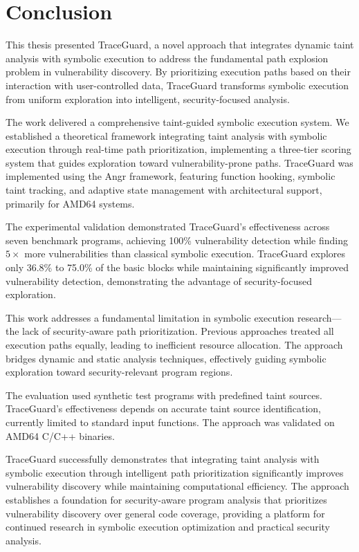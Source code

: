 \chapter{Conclusion}

This thesis presented TraceGuard, a novel approach that integrates dynamic taint analysis with symbolic execution to address the fundamental path explosion problem in vulnerability discovery. By prioritizing execution paths based on their interaction with user-controlled data, TraceGuard transforms symbolic execution from uniform exploration into intelligent, security-focused analysis.

The work delivered a comprehensive taint-guided symbolic execution system. We established a theoretical framework integrating taint analysis with symbolic execution through real-time path prioritization, implementing a three-tier scoring system that guides exploration toward vulnerability-prone paths. TraceGuard was implemented using the Angr framework, featuring function hooking, symbolic taint tracking, and adaptive state management with architectural support, primarily for AMD64 systems.

The experimental validation demonstrated TraceGuard's effectiveness across seven benchmark programs, achieving 100\% vulnerability detection while finding $5 \times$ more vulnerabilities than classical symbolic execution. TraceGuard explores only 36.8\% to 75.0\% of the basic blocks while maintaining significantly improved vulnerability detection, demonstrating the advantage of security-focused exploration.

This work addresses a fundamental limitation in symbolic execution research—the lack of security-aware path prioritization. Previous approaches treated all execution paths equally, leading to inefficient resource allocation. The approach bridges dynamic and static analysis techniques, effectively guiding symbolic exploration toward security-relevant program regions.

The evaluation used synthetic test programs with predefined taint sources. TraceGuard's effectiveness depends on accurate taint source identification, currently limited to standard input functions. The approach was validated on AMD64 C/C++ binaries.

TraceGuard successfully demonstrates that integrating taint analysis with symbolic execution through intelligent path prioritization significantly improves vulnerability discovery while maintaining computational efficiency. The approach establishes a foundation for security-aware program analysis that prioritizes vulnerability discovery over general code coverage, providing a platform for continued research in symbolic execution optimization and practical security analysis.
